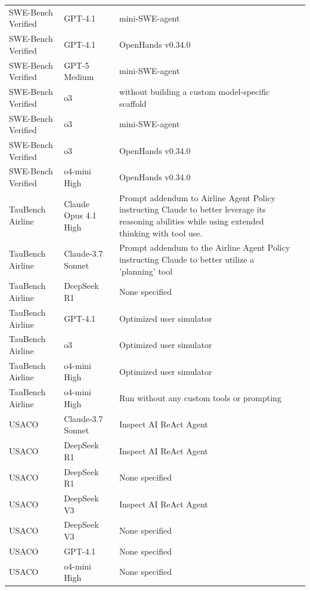 \begin{longtable}{p{2cm}p{3cm}p{5cm}p{3cm}}
  SWE-Bench Verified & GPT-4.1 & mini-SWE-agent & \cite{jimenez_swe-bench_2023,chowdhury_neil_introducing_2024} \\
  SWE-Bench Verified & GPT-4.1 & OpenHands v0.34.0 & \cite{glm-45_team_glm-45_2025,wang_openhands_2025} \\
  SWE-Bench Verified & GPT-5 Medium & mini-SWE-agent & \cite{jimenez_swe-bench_2023,chowdhury_neil_introducing_2024} \\
  SWE-Bench Verified & o3 & without building a custom model-specific scaffold & \cite{openai_o3_2025} \\
  SWE-Bench Verified & o3 & mini-SWE-agent  & \cite{jimenez_swe-bench_2023,chowdhury_neil_introducing_2024} \\
  SWE-Bench Verified & o3 & OpenHands v0.34.0 & \cite{glm-45_team_glm-45_2025,wang_openhands_2025} \\
  SWE-Bench Verified & o4-mini High & OpenHands v0.34.0 & \cite{glm-45_team_glm-45_2025,wang_openhands_2025} \\
  TauBench Airline & Claude Opus 4.1 High & Prompt addendum to Airline Agent Policy instructing Claude to better leverage its reasoning abilities while using extended thinking with tool use. & \cite{noauthor_claude_2025-1} \\
  TauBench Airline & Claude-3.7 Sonnet & Prompt addendum to the Airline Agent Policy instructing Claude to better utilize a 'planning' tool & \cite{noauthor_claude_2025} \\
  TauBench Airline & DeepSeek R1 & None specified & \cite{deepseek-ai_deepseek-r1_2025} \\
  TauBench Airline & GPT-4.1 & Optimized user simulator & \cite{glm-45_team_glm-45_2025} \\
  TauBench Airline & o3  & Optimized user simulator & \cite{glm-45_team_glm-45_2025} \\
  TauBench Airline & o4-mini High & Optimized user simulator & \cite{glm-45_team_glm-45_2025} \\
  TauBench Airline & o4-mini High & Run without any custom tools or prompting & \cite{openai_o3_2025} \\
  USACO & Claude-3.7 Sonnet & Inspect AI ReAct Agent & \cite{lab_frontier_2025,yao_react_2023,noauthor_react_nodate} \\
  USACO & DeepSeek R1 & Inspect AI ReAct Agent & \cite{lab_frontier_2025,yao_react_2023,noauthor_react_nodate} \\
  USACO & DeepSeek R1 & None specified & \cite{wang_aethercode_2025} \\
  USACO & DeepSeek V3 & Inspect AI ReAct Agent & \cite{lab_frontier_2025,yao_react_2023,noauthor_react_nodate} \\
  USACO & DeepSeek V3 & None specified & \cite{wang_aethercode_2025} \\
  USACO & GPT-4.1 & None specified & \cite{wang_aethercode_2025} \\
  USACO & o4-mini High & None specified & \cite{wang_aethercode_2025} \\
\end{longtable}